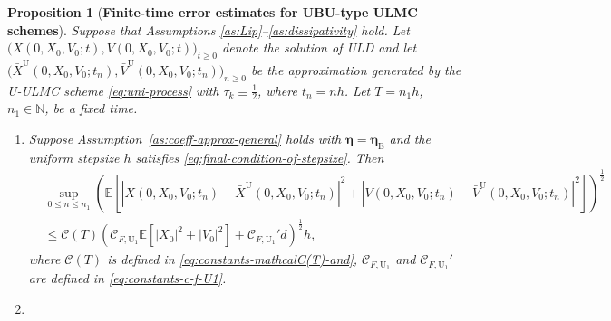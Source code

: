 \documentclass[12pt]{article}
\newenvironment{redtext}
  {\color{black}\ignorespaces}
  {\ignorespacesafterend}
\numberwithin{equation}{section}
\newtheorem{prop}{Proposition}[section]
\begin{document}
\begin{redtext}

\begin{prop}[\textbf{Finite-time error estimates for UBU-type ULMC schemes}]
\label{prop:finite-error-UBU}
Suppose that Assumptions \ref{as:Lip}--\ref{as:dissipativity} hold.
Let
\(
\bigl(X(0,X_0,V_0;t),V(0,X_0,V_0;t)\bigr)_{t\geq0}
\) denote the solution of ULD and let
\(
\bigl(
\bar X^{\mathrm{U}}(0,X_0,V_0;t_n),
\bar V^{\mathrm{U}}(0,X_0,V_0;t_n)
\bigr)_{n\geq0}
\)
be the approximation
generated by the U-ULMC scheme \eqref{eq:uni-process} with
$\tau_k\equiv\frac12$, where $t_n=nh$.
Let $T=n_1h$, $n_1\in\mathbb N$, be a fixed time.
\begin{enumerate}
\item 
Suppose Assumption~\ref{as:coeff-approx-general} holds with
$\boldsymbol{\eta}=\boldsymbol{\eta}_{\mathrm E}$ and the
uniform stepsize $h$ satisfies \eqref{eq:final-condition-of-stepsize}.
Then
\begin{equation}
\label{eq:sup-second-moment-error-finite-time-UBU-gl}
\begin{aligned}
&
\sup_{0\leq n\leq n_1}
\left(
\mathbb E
\left[
\left|
X(0,X_0,V_0;t_n)
-
\bar X^{\mathrm{U}}(0,X_0,V_0;t_n)
\right|^2
+
\left|
V(0,X_0,V_0;t_n)
-
\bar V^{\mathrm{U}}(0,X_0,V_0;t_n)
\right|^2
\right]
\right)^{\frac12}
\\
&\leq
\mathcal C(T)
\left(
\mathcal C_{F,\mathrm{U}_1}
\mathbb E
\left[
|X_0|^2+|V_0|^2
\right]
+
\mathcal C_{F,\mathrm{U}_1}'d
\right)^{\frac12}
h,
\end{aligned}
\end{equation}
where $\mathcal C(T)$ is defined in
\eqref{eq:constants-mathcalC(T)-and},
$\mathcal C_{F,\mathrm U_1}$ and
$\mathcal C_{F,\mathrm U_1}'$ are defined in
\eqref{eq:constants-c-f-U1}.
\item 

\end{enumerate}
\end{prop}
\end{redtext}
\end{document}
